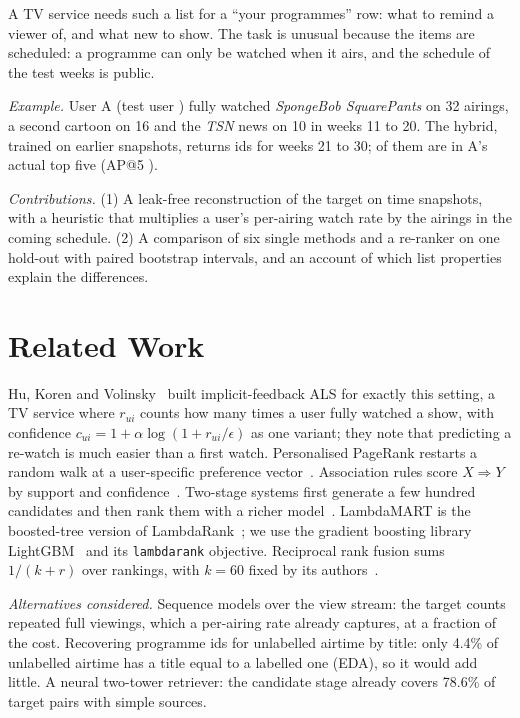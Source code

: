 \documentclass[conference]{IEEEtran}
\begin{document}
A TV service needs such a list for a ``your programmes'' row: what to remind a viewer of, and what new to show. The task is unusual because the items are scheduled: a programme can only be watched when it airs, and the schedule of the test weeks is public.

\emph{Example.} User A (test user \userA) fully watched \emph{SpongeBob SquarePants} on 32 airings, a second cartoon on 16 and the \emph{TSN} news on 10 in weeks 11 to 20. The hybrid, trained on earlier snapshots, returns ids \hybListA{} for weeks 21 to 30; \hybHitsA{} of them are in A's actual top five (AP@5 \apHybridA).

\emph{Contributions.} (1) A leak-free reconstruction of the target on time snapshots, with a heuristic that multiplies a user's per-airing watch rate by the airings in the coming schedule. (2) A comparison of six single methods and a re-ranker on one hold-out with paired bootstrap intervals, and an account of which list properties explain the differences.

\section{Related Work}
Hu, Koren and Volinsky~\cite{hu2008} built implicit-feedback ALS for exactly this setting, a TV service where $r_{ui}$ counts how many times a user fully watched a show, with confidence $c_{ui}=1+\alpha\log(1+r_{ui}/\epsilon)$ as one variant; they note that predicting a re-watch is much easier than a first watch. Personalised PageRank restarts a random walk at a user-specific preference vector~\cite{jeh2003}. Association rules score $X\Rightarrow Y$ by support and confidence~\cite{agrawal1993}. Two-stage systems first generate a few hundred candidates and then rank them with a richer model~\cite{covington2016}. LambdaMART is the boosted-tree version of LambdaRank~\cite{burges2010}; we use the gradient boosting library LightGBM~\cite{ke2017} and its \texttt{lambdarank} objective. Reciprocal rank fusion sums $1/(k+r)$ over rankings, with $k=60$ fixed by its authors~\cite{cormack2009}.

\emph{Alternatives considered.} Sequence models over the view stream: the target counts repeated full viewings, which a per-airing rate already captures, at a fraction of the cost. Recovering programme ids for unlabelled airtime by title: only 4.4\% of unlabelled airtime has a title equal to a labelled one (EDA), so it would add little. A neural two-tower retriever: the candidate stage already covers 78.6\% of target pairs with simple sources.
\end{document}

